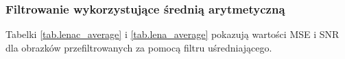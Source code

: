 \documentclass{classrep}
\begin{document}


\subsubsection{Filtrowanie wykorzystujące średnią arytmetyczną}
Tabelki \ref{tab.lenac_average} i \ref{tab.lena_average} pokazują wartości MSE i SNR dla obrazków przefiltrowanych za pomocą filtru uśredniającego.
\end{document}
